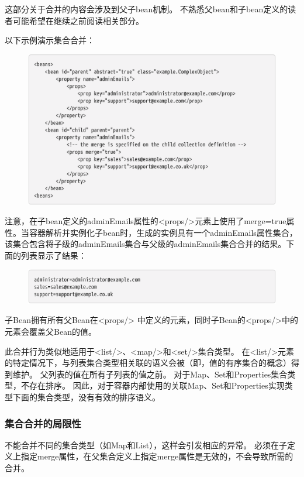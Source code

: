 这部分关于合并的内容会涉及到父子bean机制。
不熟悉父bean和子bean定义的读者可能希望在继续之前阅读相关部分。

以下示例演示集合合并：

\begin{figure}[ht]
    \centering
    \includegraphics[width=1\linewidth]{./Figure/IMG_code_43.png}
\end{figure}

注意，在子bean定义的adminEmails属性的<props/>元素上使用了merge=true属性。当容器解析并实例化子bean时，生成的实例具有一个adminEmails属性集合，该集合包含将子级的adminEmails集合与父级的adminEmails集合合并的结果。下面的列表显示了结果：

\begin{figure}[ht]
    \centering
    \includegraphics[width=1\linewidth]{./Figure/IMG_code_44.png}
\end{figure}


子Bean拥有所有父Bean在<props/> 中定义的元素，同时子Bean的<props/>中的元素会覆盖父Bean的值。

此合并行为类似地适用于<list/>、<map/>和<set/>集合类型。
在<list/>元素的特定情况下，与列表集合类型相关联的语义会被（即，值的有序集合的概念）得到维护。
父列表的值在所有子列表的值之前。
对于Map、Set和Properties集合类型，不存在排序。
因此，对于容器内部使用的关联Map、Set和Properties实现类型下面的集合类型，没有有效的排序语义。

\subsubsection{集合合并的局限性}
不能合并不同的集合类型（如Map和List），这样会引发相应的异常。
必须在子定义上指定merge属性，在父集合定义上指定merge属性是无效的，不会导致所需的合并。

